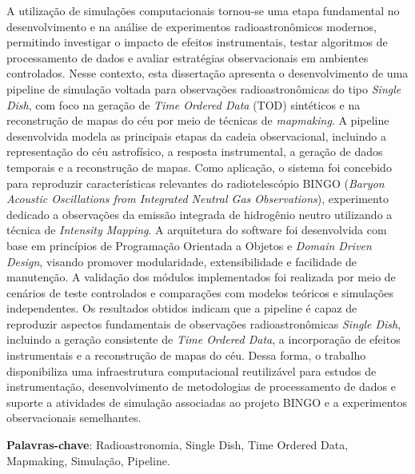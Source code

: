 
\setlength{\absparsep}{18pt} %
\begin{resumo}
	A utilização de simulações computacionais tornou-se uma etapa fundamental no desenvolvimento e na análise de experimentos radioastronômicos modernos, permitindo investigar o impacto de efeitos instrumentais, testar algoritmos de processamento de dados e avaliar estratégias observacionais em ambientes controlados. Nesse contexto, esta dissertação apresenta o desenvolvimento de uma pipeline de simulação voltada para observações radioastronômicas do tipo \textit{Single Dish}, com foco na geração de \textit{Time Ordered Data} (TOD) sintéticos e na reconstrução de mapas do céu por meio de técnicas de \textit{mapmaking}.
	A pipeline desenvolvida modela as principais etapas da cadeia observacional, incluindo a representação do céu astrofísico, a resposta instrumental, a geração de dados temporais e a reconstrução de mapas. Como aplicação, o sistema foi concebido para reproduzir características relevantes do radiotelescópio BINGO (\textit{Baryon Acoustic Oscillations from Integrated Neutral Gas Observations}), experimento dedicado a observações da emissão integrada de hidrogênio neutro utilizando a técnica de \textit{Intensity Mapping}.
	A arquitetura do software foi desenvolvida com base em princípios de Programação Orientada a Objetos e \textit{Domain Driven Design}, visando promover modularidade, extensibilidade e facilidade de manutenção. A validação dos módulos implementados foi realizada por meio de cenários de teste controlados e comparações com modelos teóricos e simulações independentes.
	Os resultados obtidos indicam que a pipeline é capaz de reproduzir aspectos fundamentais de observações radioastronômicas \textit{Single Dish}, incluindo a geração consistente de \textit{Time Ordered Data}, a incorporação de efeitos instrumentais e a reconstrução de mapas do céu. Dessa forma, o trabalho disponibiliza uma infraestrutura computacional reutilizável para estudos de instrumentação, desenvolvimento de metodologias de processamento de dados e suporte a atividades de simulação associadas ao projeto BINGO e a experimentos observacionais semelhantes.


\vspace{\onelineskip}
	\noindent
	\textbf{Palavras-chave}: Radioastronomia, Single Dish, Time Ordered Data, Mapmaking, Simulação, Pipeline.
\end{resumo}

